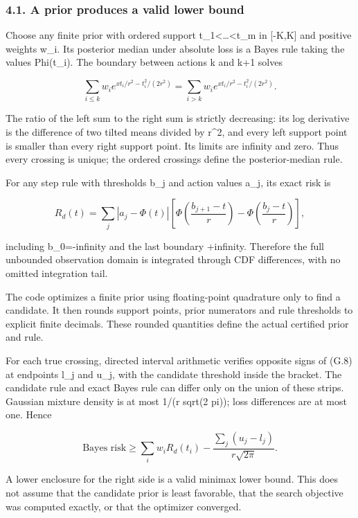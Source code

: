 \subsubsection{4.1. A prior produces a valid lower
bound}\label{gaussian_decision-a-prior-produces-a-valid-lower-bound}

Choose any finite prior with ordered support
t\_1\textless\ldots\textless t\_m in {[}-K,K{]} and positive weights
w\_i. Its posterior median under absolute loss is a Bayes rule taking
the values Phi(t\_i). The boundary between actions k and k+1 solves

\[
\sum_{i\le k}w_i e^{x t_i/r^2-t_i^2/(2r^2)}
=\sum_{i>k}w_i e^{x t_i/r^2-t_i^2/(2r^2)}.
\tag{G.8}
\]

The ratio of the left sum to the right sum is strictly decreasing: its
log derivative is the difference of two tilted means divided by r\^{}2,
and every left support point is smaller than every right support point.
Its limits are infinity and zero. Thus every crossing is unique; the
ordered crossings define the posterior-median rule.

For any step rule with thresholds b\_j and action values a\_j, its exact
risk is

\[
R_d(t)=\sum_j |a_j-\Phi(t)|
\left[\Phi\left(\frac{b_{j+1}-t}{r}\right)
      -\Phi\left(\frac{b_j-t}{r}\right)\right],
\tag{G.9}
\]

including b\_0=-infinity and the last boundary +infinity. Therefore the
full unbounded observation domain is integrated through CDF differences,
with no omitted integration tail.

The code optimizes a finite prior using floating-point quadrature only
to find a candidate. It then rounds support points, prior numerators and
rule thresholds to explicit finite decimals. These rounded quantities
define the actual certified prior and rule.

For each true crossing, directed interval arithmetic verifies opposite
signs of (G.8) at endpoints l\_j and u\_j, with the candidate threshold
inside the bracket. The candidate rule and exact Bayes rule can differ
only on the union of these strips. Gaussian mixture density is at most
1/(r sqrt(2 pi)); loss differences are at most one. Hence

\[
\text{Bayes risk}\ge
\sum_i w_i R_d(t_i)-\frac{\sum_j(u_j-l_j)}{r\sqrt{2\pi}}.
\tag{G.10}
\]

A lower enclosure for the right side is a valid minimax lower bound.
This does not assume that the candidate prior is least favorable, that
the search objective was computed exactly, or that the optimizer
converged.

